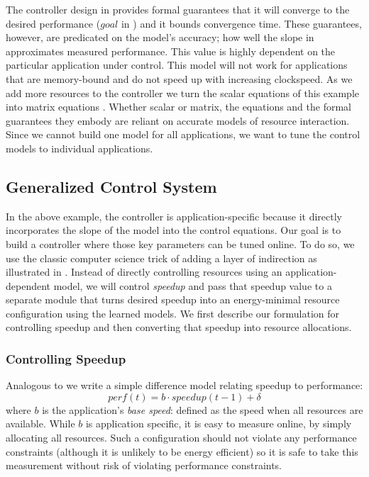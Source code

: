 The controller design in  provides formal
guarantees that it will converge to the desired performance ($goal$ in
) and it bounds convergence time.  These
guarantees, however, are predicated on the model's accuracy; \ie{} how
well the slope in  approximates measured
performance.  This value is highly dependent on the particular
application under control.  This model will not work for applications
that are memory-bound and do not speed up with increasing clockspeed.
As we add more resources to the controller we turn the scalar
equations of this example into matrix equations
\cite{METE,josep-isca2016}.  Whether scalar or matrix, the equations
and the formal guarantees they embody are reliant on accurate models
of resource interaction.  Since we cannot build one model for all
applications, we want to tune the control models to individual
applications.

\subsection{Generalized Control System}
In the above example, the controller is application-specific because
it directly incorporates the slope of the model into the control
equations.  Our goal is to build a controller where those key
parameters can be tuned online.  To do so, we use the classic computer
science trick of adding a layer of indirection as illustrated in
.  Instead of directly controlling resources
using an application-dependent model, we will control \emph{speedup}
and pass that speedup value to a separate module that turns desired
speedup into an energy-minimal resource configuration using the
learned models.  We first describe our formulation for controlling
speedup and then converting that speedup into resource allocations.

\subsubsection{Controlling Speedup}
Analogous to  we write a simple difference model
relating speedup to performance:
\begin{equation}
  perf(t) = b \cdot speedup(t-1) + \delta \label{eqn:speedup}
\end{equation}
where $b$ is the application's \emph{base speed}: defined as the speed
when all resources are available.  While $b$ is application specific,
it is easy to measure online, by simply allocating all resources. Such
a configuration should not violate any performance constraints
(although it is unlikely to be energy efficient) so it is safe to take
this measurement without risk of violating performance constraints.

